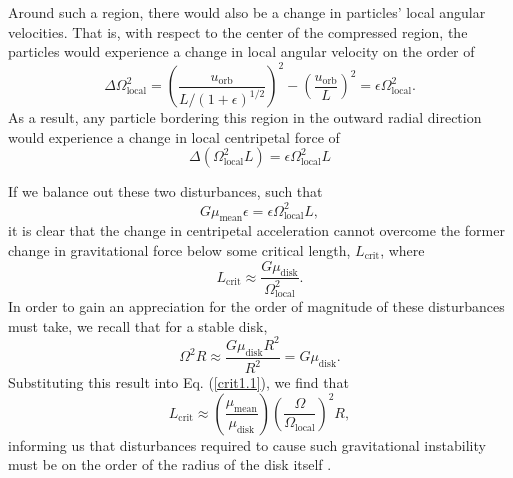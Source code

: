 \documentclass[aps,pra,twocolumn]{revtex4-1}
\begin{document}
Around such a region, there would also be a change in particles' local angular velocities.  That is, with respect to the center of the compressed region, the particles would experience a change in local angular velocity on the order of 
\begin{equation}
\Delta \Omega_\text{local}^2 = \left(\frac{u_\text{orb}}{L/(1+\epsilon)^{1/2}}\right)^2 - \left(\frac{u_\text{orb}}{L}\right)^2 =  \epsilon\Omega_\text{local}^2.
\end{equation}
As a result, any particle bordering this region in the outward radial direction would experience a change in local centripetal force of \cite{toomre1964}
\begin{equation}
\Delta (\Omega_\text{local}^2 L) = \epsilon \Omega_\text{local}^2 L
\end{equation}

If we balance out these two disturbances, such that
\begin{equation}
G \mu_\text{mean} \epsilon = \epsilon \Omega_\text{local}^2 L ,
\end{equation}
it is clear that the change in centripetal acceleration cannot overcome the former change in gravitational force below some critical length, $L_\text{crit}$, where
\begin{equation}
L_\text{crit} \approx \frac{G \mu_\text{disk}}{\Omega_\text{local}^2}. \label{crit1.1}
\end{equation}
In order to gain an appreciation for the order of magnitude of these disturbances must take, we recall that for a stable disk,
\begin{equation}
\Omega^2 R \approx \frac{G\mu_\text{disk} R^2}{R^2} = G\mu_\text{disk}.
\end{equation}
Substituting this result into Eq. (\ref{crit1.1}), we find that
\begin{equation}
L_\text{crit} \approx \left(\frac{\mu_\text{mean}}{\mu_\text{disk}}\right)\left(\frac{\Omega}{\Omega_\text{local}}\right)^2 R,
\end{equation}
informing us that disturbances required to cause such gravitational instability must be on the order of the radius of the disk itself \cite{toomre1964}.
\end{document}
